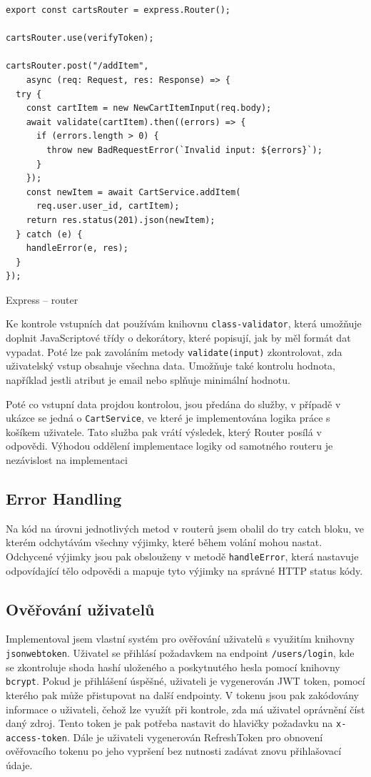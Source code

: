 \documentclass[thesis=M,czech]{FITthesis}[2019/12/23]
\begin{document}
\begin{listing}[H]
\begin{verbatim}
export const cartsRouter = express.Router();

cartsRouter.use(verifyToken);

cartsRouter.post("/addItem",
    async (req: Request, res: Response) => {
  try {
    const cartItem = new NewCartItemInput(req.body);
    await validate(cartItem).then((errors) => {
      if (errors.length > 0) {
        throw new BadRequestError(`Invalid input: ${errors}`);
      }
    });
    const newItem = await CartService.addItem(
      req.user.user_id, cartItem);
    return res.status(201).json(newItem);
  } catch (e) {
    handleError(e, res);
  }
});
\end{verbatim}
\caption{Express -- router}
\label{lst:express_router}
\end{listing}

Ke kontrole vstupních dat používám knihovnu \texttt{class-validator}, která umožňuje doplnit JavaScriptové třídy o dekorátory, které popisují, jak by měl formát dat vypadat. Poté lze pak zavoláním metody \texttt{validate(input)} zkontrolovat, zda uživatelský vstup obsahuje všechna data. Umožňuje také kontrolu hodnota, například jestli atribut je email nebo splňuje minimální hodnotu.

Poté co vstupní data projdou kontrolou, jsou předána do služby, v případě v ukázce se jedná o \texttt{CartService}, ve které je implementována logika práce s košíkem uživatele. Tato služba pak vrátí výsledek, který Router posílá v odpovědi. Výhodou oddělení implementace logiky od samotného routeru je nezávislost na implementaci

\subsection{Error Handling}
Na kód na úrovni jednotlivých metod v routerů jsem obalil do try catch bloku, ve kterém odchytávám všechny výjimky, které během volání mohou nastat. Odchycené výjimky jsou pak obslouženy v metodě \texttt{handleError}, která nastavuje odpovídající tělo odpovědi a mapuje tyto výjimky na správné HTTP status kódy.

\subsection{Ověřování uživatelů}
Implementoval jsem vlastní systém pro ověřování uživatelů s využitím knihovny \texttt{jsonwebtoken}. Uživatel se přihlásí požadavkem na endpoint \texttt{/users/login}, kde se zkontroluje shoda hashí uloženého a poskytnutého hesla pomocí knihovny \texttt{bcrypt}. Pokud je přihlášení úspěšné, uživateli je vygenerován JWT token, pomocí kterého pak může přistupovat na další endpointy. V tokenu jsou pak zakódovány informace o uživateli, čehož lze využít při kontrole, zda má uživatel oprávnění číst daný zdroj. Tento token je pak potřeba nastavit do hlavičky požadavku na \texttt{x-access-token}. Dále je uživateli vygenerován RefreshToken pro obnovení ověřovacího tokenu po jeho vypršení bez nutnosti zadávat znovu přihlašovací údaje.
\end{document}
